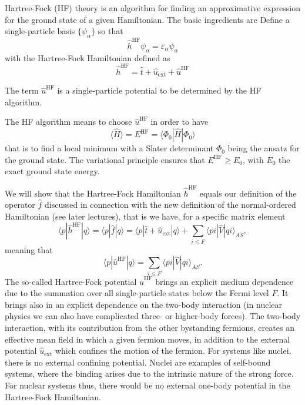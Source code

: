 Hartree-Fock (HF) theory is an algorithm for finding an approximative
expression for the ground state of a given Hamiltonian. The basic
ingredients are Define a single-particle basis $\{\psi_{\alpha}\}$ so
that
\[ 
\hat{h}^{\mathrm{HF}}\psi_{\alpha} = \varepsilon_{\alpha}\psi_{\alpha}
\]
with the Hartree-Fock Hamiltonian defined as
\[
\hat{h}^{\mathrm{HF}}=\hat{t}+\hat{u}_{\mathrm{ext}}+\hat{u}^{\mathrm{HF}}
\]

The term $\hat{u}^{\mathrm{HF}}$ is a single-particle potential to be
determined by the HF algorithm.

The HF algorithm means to choose $\hat{u}^{\mathrm{HF}}$ in order to
have
\[ \langle \hat{H} \rangle = E^{\mathrm{HF}}= \langle \Phi_0 | \hat{H}|\Phi_0 \rangle
\]
that is to find a local minimum with a Slater determinant $\Phi_0$
being the ansatz for the ground state.  The variational principle
ensures that $E^{\mathrm{HF}} \ge E_0$, with $E_0$ the exact ground
state energy.

We will show that the Hartree-Fock Hamiltonian $\hat{h}^{\mathrm{HF}}$
equals our definition of the operator $\hat{f}$ discussed in
connection with the new definition of the normal-ordered Hamiltonian
(see later lectures), that is we have, for a specific matrix element
\[
\langle p |\hat{h}^{\mathrm{HF}}| q \rangle =\langle p |\hat{f}| q \rangle=\langle p|\hat{t}+\hat{u}_{\mathrm{ext}}|q \rangle +\sum_{i\le F} \langle pi | \hat{V} | qi\rangle_{AS},
\]
meaning that
\[
\langle p|\hat{u}^{\mathrm{HF}}|q\rangle = \sum_{i\le F} \langle pi | \hat{V} | qi\rangle_{AS}.
\]
The so-called Hartree-Fock potential $\hat{u}^{\mathrm{HF}}$ brings an
explicit medium dependence due to the summation over all
single-particle states below the Fermi level $F$. It brings also in an
explicit dependence on the two-body interaction (in nuclear physics we
can also have complicated three- or higher-body forces). The two-body
interaction, with its contribution from the other bystanding fermions,
creates an effective mean field in which a given fermion moves, in
addition to the external potential $\hat{u}_{\mathrm{ext}}$ which
confines the motion of the fermion. For systems like nuclei, there is
no external confining potential. Nuclei are examples of self-bound
systems, where the binding arises due to the intrinsic nature of the
strong force. For nuclear systems thus, there would be no external
one-body potential in the Hartree-Fock Hamiltonian.


